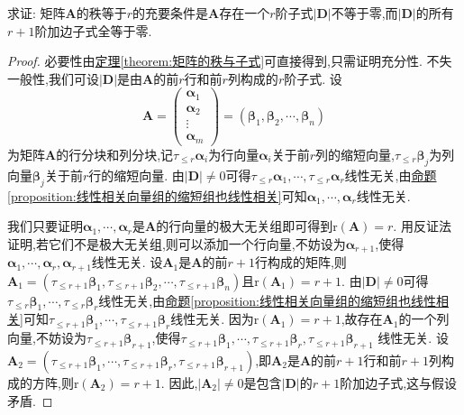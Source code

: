 \documentclass[../../main.tex]{subfiles}
\begin{document}
\begin{proposition}\label{proposition:矩阵的秩与子式及其加边子式的关系}
求证: 矩阵\(\boldsymbol{A}\)的秩等于\(r\)的充要条件是\(\boldsymbol{A}\)存在一个\(r\)阶子式\(|\boldsymbol{D}|\)不等于零,而\(|\boldsymbol{D}|\)的所有\(r + 1\)阶加边子式全等于零.
\end{proposition}
\begin{proof}
必要性由\hyperref[theorem:矩阵的秩与子式]{定理\ref{theorem:矩阵的秩与子式}}可直接得到,只需证明充分性. 不失一般性,我们可设\(|\boldsymbol{D}|\)是由\(\boldsymbol{A}\)的前\(r\)行和前\(r\)列构成的\(r\)阶子式. 设
\[
\boldsymbol{A}=\begin{pmatrix}
\boldsymbol{\alpha}_1\\
\boldsymbol{\alpha}_2\\
\vdots\\
\boldsymbol{\alpha}_m
\end{pmatrix}=(\boldsymbol{\beta}_1,\boldsymbol{\beta}_2,\cdots,\boldsymbol{\beta}_n)
\]
为矩阵\(\boldsymbol{A}\)的行分块和列分块,记\(\tau_{\leqslant  r}\boldsymbol{\alpha}_i\)为行向量\(\boldsymbol{\alpha}_i\)关于前\(r\)列的缩短向量,\(\tau_{\leqslant  r}\boldsymbol{\beta}_j\)为列向量\(\boldsymbol{\beta}_j\)关于前\(r\)行的缩短向量. 由\(|\boldsymbol{D}|\neq0\)可得\(\tau_{\leqslant  r}\boldsymbol{\alpha}_1,\cdots,\tau_{\leqslant  r}\boldsymbol{\alpha}_r\)线性无关,由\hyperref[proposition:线性相关向量组的缩短组也线性相关]{命题\ref{proposition:线性相关向量组的缩短组也线性相关}}可知\(\boldsymbol{\alpha}_1,\cdots,\boldsymbol{\alpha}_r\)线性无关. 

我们只要证明\(\boldsymbol{\alpha}_1,\cdots,\boldsymbol{\alpha}_r\)是\(\boldsymbol{A}\)的行向量的极大无关组即可得到\(\mathrm{r}(\boldsymbol{A}) = r\). 用反证法证明,若它们不是极大无关组,则可以添加一个行向量,不妨设为\(\boldsymbol{\alpha}_{r + 1}\),使得\(\boldsymbol{\alpha}_1,\cdots,\boldsymbol{\alpha}_r,\boldsymbol{\alpha}_{r + 1}\)线性无关. 设\(\boldsymbol{A}_1\)是\(\boldsymbol{A}\)的前\(r + 1\)行构成的矩阵,则\(\boldsymbol{A}_1 = (\tau_{\leqslant  r + 1}\boldsymbol{\beta}_1,\tau_{\leqslant  r + 1}\boldsymbol{\beta}_2,\cdots,\tau_{\leqslant  r + 1}\boldsymbol{\beta}_n)\)且\(\mathrm{r}(\boldsymbol{A}_1)=r + 1\). 由\(|\boldsymbol{D}|\neq0\)可得\(\tau_{\leqslant  r}\boldsymbol{\beta}_1,\cdots,\tau_{\leqslant  r}\boldsymbol{\beta}_r\)线性无关,由\hyperref[proposition:线性相关向量组的缩短组也线性相关]{命题\ref{proposition:线性相关向量组的缩短组也线性相关}}可知\(\tau_{\leqslant  r + 1}\boldsymbol{\beta}_1,\cdots,\tau_{\leqslant  r + 1}\boldsymbol{\beta}_r\)线性无关. 因为\(\mathrm{r}(\boldsymbol{A}_1)=r + 1\),故存在\(\boldsymbol{A}_1\)的一个列向量,不妨设为\(\tau_{\leqslant  r + 1}\boldsymbol{\beta}_{r + 1}\),使得\(\tau_{\leqslant  r + 1}\boldsymbol{\beta}_1,\cdots,\tau_{\leqslant  r + 1}\boldsymbol{\beta}_r,\tau_{\leqslant  r + 1}\boldsymbol{\beta}_{r + 1}\)
线性无关. 设\(\boldsymbol{A}_2 = (\tau_{\leqslant  r + 1}\boldsymbol{\beta}_1,\cdots,\tau_{\leqslant  r + 1}\boldsymbol{\beta}_r,\tau_{\leqslant  r + 1}\boldsymbol{\beta}_{r + 1})\),即\(\boldsymbol{A}_2\)是\(\boldsymbol{A}\)的前\(r + 1\)行和前\(r + 1\)列构成的方阵,则\(\mathrm{r}(\boldsymbol{A}_2)=r + 1\). 因此,\(|\boldsymbol{A}_2|\neq0\)是包含\(|\boldsymbol{D}|\)的\(r + 1\)阶加边子式,这与假设矛盾.
\end{proof}
\end{document}
